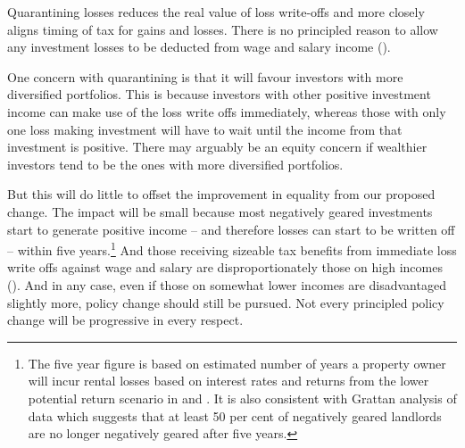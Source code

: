 Quarantining losses reduces the real value of loss write-offs and more closely aligns timing of tax for gains and losses. There is no principled reason to allow any investment losses to be deducted from wage and salary income (). 

One concern with quarantining is that it will favour investors with more diversified portfolios. This is because investors with other positive investment income can make use of the loss write offs immediately, whereas those with only one loss making investment will have to wait until the income from that investment is positive. There may arguably be an equity concern if wealthier investors tend to be the ones with more diversified portfolios. 

But this will do little to offset the improvement in equality from our proposed change. 
The impact will be small because most negatively geared investments start to generate positive income – and therefore losses can start to be written off – within five years.\footnote{The five year figure\label{footnote:number-years-for-NG} is based on estimated number of years a property owner will incur rental losses based on interest rates and returns from the lower potential return scenario in  and . It is also consistent with Grattan analysis of \textcite{HILDA2015} data which suggests that at least 50 per cent of negatively geared landlords are no longer negatively geared after five years. }  
And those receiving sizeable tax benefits from immediate loss write offs against wage and salary are disproportionately those on high incomes (). 
And in any case, even if those on somewhat lower incomes are disadvantaged slightly more, policy change should still be pursued. Not every principled policy change will be progressive in every respect.

